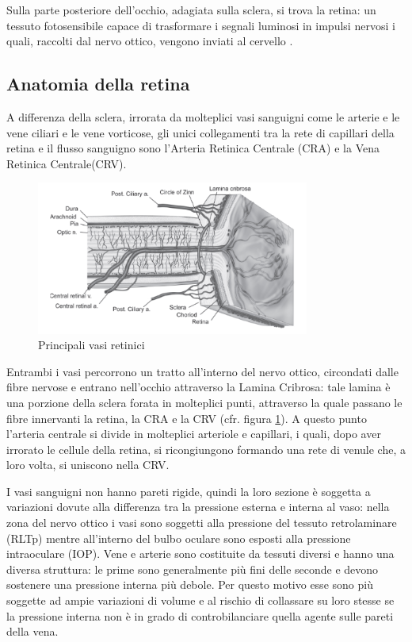 \documentclass{article}
\begin{document}
Sulla parte posteriore dell'occhio, adagiata sulla sclera, si trova la retina: un tessuto fotosensibile capace di trasformare i segnali luminosi in impulsi nervosi i quali, raccolti dal nervo ottico, vengono inviati al cervello \cite{Tesi}.
\subsection{Anatomia della retina}
A differenza della sclera, irrorata da molteplici vasi sanguigni come le arterie e le vene ciliari e le vene vorticose, gli unici collegamenti tra la rete di capillari della retina e il flusso sanguigno sono l'Arteria Retinica Centrale (CRA) e la Vena Retinica Centrale(CRV).
\begin{figure}[h]
\begin{center}
\includegraphics[width=0.8\textwidth]{Pictures/Optic_nerve.png}
\caption{Principali vasi retinici \cite{Tesi}}
\label{retina}
\end{center}
\end{figure}
Entrambi i vasi percorrono un tratto all'interno del nervo ottico, circondati dalle fibre nervose e entrano nell'occhio attraverso la Lamina Cribrosa: tale lamina è una porzione della sclera forata in molteplici punti, attraverso la quale passano le fibre innervanti la retina, la CRA e la CRV (cfr. figura \ref{retina}).
A questo punto l'arteria centrale si divide in molteplici arteriole e capillari, i quali, dopo aver irrorato le cellule della retina, si ricongiungono formando una rete di venule che, a loro volta, si uniscono nella CRV.

I vasi sanguigni non hanno pareti rigide, quindi la loro sezione è soggetta a variazioni dovute alla differenza tra la pressione esterna e interna al vaso: nella zona del nervo ottico i vasi sono soggetti alla pressione del tessuto retrolaminare (RLTp) mentre all'interno del bulbo oculare sono esposti alla pressione intraoculare (IOP).
Vene e arterie sono costituite da tessuti diversi e hanno una diversa struttura: le prime sono generalmente più fini delle seconde e devono sostenere una pressione interna più debole.
Per questo motivo esse sono più soggette ad ampie variazioni di volume e al rischio di collassare su loro stesse se la pressione interna non è in grado di controbilanciare quella agente sulle pareti della vena.
\end{document}
